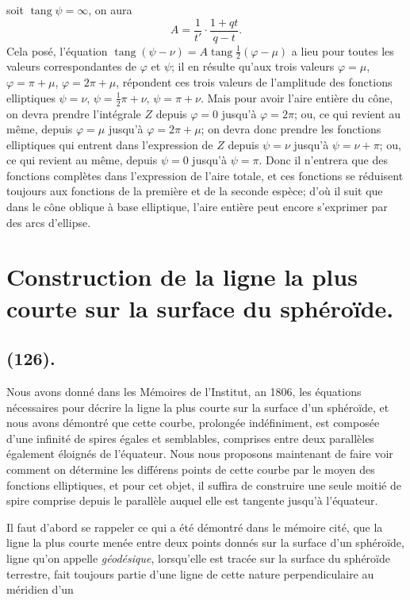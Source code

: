 \documentclass{article}
\begin{document}
soit $\operatorname{tang}\psi=\infty$, on aura
\[ A=\frac{1}{t'}\cdot\frac{1+qt}{q-t}. \]
Cela posé, l'équation $\operatorname{tang}(\psi-\nu)=A\operatorname{tang}\frac{1}{2}(\varphi-\mu)$ a lieu pour toutes les valeurs correspondantes de $\varphi$ et $\psi$; il en résulte qu'aux trois valeurs $\varphi=\mu$, $\varphi=\pi+\mu$, $\varphi=2\pi+\mu$, répondent ces trois valeurs de l'amplitude des fonctions elliptiques $\psi=\nu$, $\psi=\frac{1}{2}\pi+\nu$, $\psi=\pi+\nu$. Mais pour avoir l'aire entière du cône, on devra prendre l'intégrale $Z$ depuis $\varphi=0$ jusqu'à $\varphi=2\pi$; ou, ce qui revient au même, depuis $\varphi=\mu$ jusqu'à $\varphi=2\pi+\mu$; on devra donc prendre les fonctions elliptiques qui entrent dans l'expression de $Z$ depuis $\psi=\nu$ jusqu'à $\psi=\nu+\pi$; ou, ce qui revient au même, depuis $\psi=0$ jusqu'à $\psi=\pi$. Donc il n'entrera que des fonctions complètes dans l'expression de l'aire totale, et ces fonctions se réduisent toujours aux fonctions de la première et de la seconde espèce; d'où il suit que dans le cône oblique à base elliptique, l'aire entière peut encore s'exprimer par des arcs d'ellipse.

\section*{Construction de la ligne la plus courte sur la surface du sphéroïde.}

\subsection*{(126).}

Nous avons donné dans les Mémoires de l'Institut, an 1806, les équations nécessaires pour décrire la ligne la plus courte sur la surface d'un sphéroïde, et nous avons démontré que cette courbe, prolongée indéfiniment, est composée d'une infinité de spires égales et semblables, comprises entre deux parallèles également éloignés de l'équateur. Nous nous proposons maintenant de faire voir comment on détermine les différens points de cette courbe par le moyen des fonctions elliptiques, et pour cet objet, il suffira de construire une seule moitié de spire comprise depuis le parallèle auquel elle est tangente jusqu'à l'équateur.

Il faut d'abord se rappeler ce qui a été démontré dans le mémoire cité, que la ligne la plus courte menée entre deux points donnés sur la surface d'un sphéroïde, ligne qu'on appelle \emph{géodésique}, lorsqu'elle est tracée sur la surface du sphéroïde terrestre, fait toujours partie d'une ligne de cette nature perpendiculaire au méridien d'un
\end{document}
